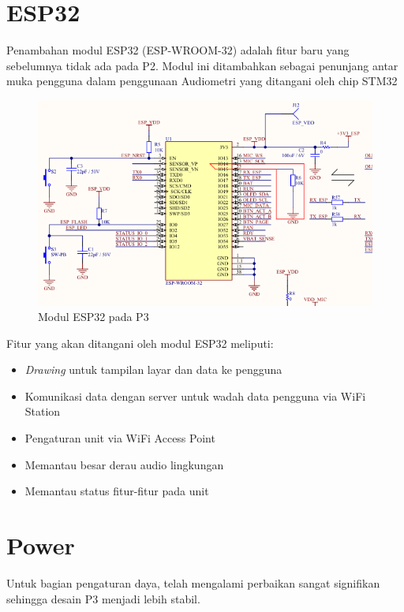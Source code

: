 \documentclass{book} %
\begin{document}
    \section{ESP32}
    
    Penambahan modul ESP32 (ESP-WROOM-32) adalah fitur baru yang sebelumnya 
    tidak ada pada P2.
    Modul ini ditambahkan sebagai penunjang antar muka pengguna dalam penggunaan 
    Audiometri yang ditangani oleh chip STM32
    
    \begin{figure}[!ht]
    	\centering
    	\includegraphics[width=400pt]{images/p3_esp32}
    	\caption{Modul ESP32 pada P3}
    \end{figure}
	
	\newpage
	Fitur yang akan ditangani oleh modul ESP32 meliputi:
	\begin{itemize}
		\item \textit{Drawing} untuk tampilan layar dan data ke pengguna
		\item Komunikasi data dengan server untuk wadah data pengguna via WiFi Station
		\item Pengaturan unit via WiFi Access Point
		\item Memantau besar derau audio lingkungan
		\item Memantau status fitur-fitur pada unit
	\end{itemize}
    
    \section{Power}
    
    Untuk bagian pengaturan daya, telah mengalami perbaikan sangat signifikan sehingga desain P3 menjadi lebih stabil.
    
\end{document}
